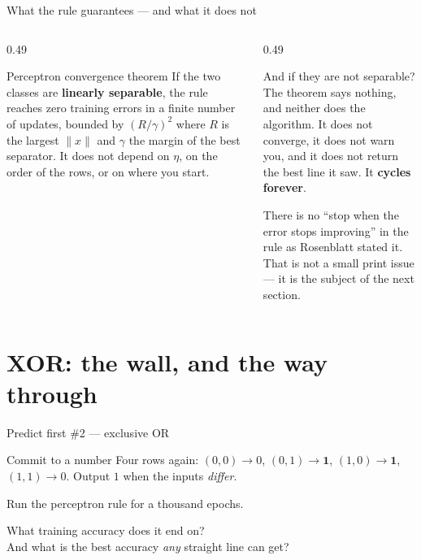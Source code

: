 \documentclass[aspectratio=169]{beamer}
\begin{document}
\begin{frame}[shrink=4]{What the rule guarantees --- and what it does not}
  \begin{columns}[T]
    \begin{column}{0.49\textwidth}
      \begin{exampleblock}{Perceptron convergence theorem}
        If the two classes are \textbf{linearly separable}, the rule reaches
        zero training errors in a finite number of updates, bounded by
        $(R/\gamma)^2$ where $R$ is the largest $\|x\|$ and $\gamma$ the
        margin of the best separator. It does not depend on $\eta$, on the
        order of the rows, or on where you start.
      \end{exampleblock}
    \end{column}
    \begin{column}{0.49\textwidth}
      \begin{alertblock}{And if they are not separable?}
        The theorem says nothing, and neither does the algorithm. It does not
        converge, it does not warn you, and it does not return the best line
        it saw. It \textbf{cycles forever}.

        \medskip
        There is no ``stop when the error stops improving'' in the rule as
        Rosenblatt stated it. That is not a small print issue --- it is the
        subject of the next section.
      \end{alertblock}
    \end{column}
  \end{columns}
\end{frame}

\section[XOR]{XOR: the wall, and the way through}
\label{sec:xor}

\begin{frame}[shrink=6]{Predict first \#2 --- exclusive OR}
  \begin{alertblock}{Commit to a number}
    Four rows again: $(0,0)\to 0$, $(0,1)\to \mathbf{1}$,
    $(1,0)\to \mathbf{1}$, $(1,1)\to 0$. Output $1$ when the inputs
    \emph{differ}.

    \medskip
    Run the perceptron rule for a thousand epochs.

    \medskip
    \centering\large
    What training accuracy does it end on?\\
    And what is the best accuracy \emph{any} straight line can get?
  \end{alertblock}
\end{frame}
\end{document}
